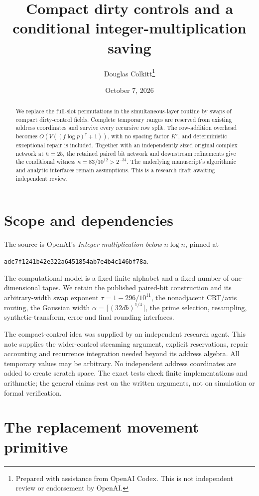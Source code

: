 \documentclass[11pt]{article}
\title{Compact dirty controls and a conditional integer-multiplication saving}
\author{Douglas Colkitt\thanks{Prepared with assistance from OpenAI Codex.
This is not independent review or endorsement by OpenAI.}}
\date{October 7, 2026}
\begin{document}
\maketitle
\begin{abstract}
We replace the full-slot permutations in the simultaneous-layer routine by
swaps of compact dirty-control fields. Complete temporary ranges are reserved
from existing address coordinates and survive every recursive row split.
The row-addition overhead becomes $O(V((f\log p)^\tau+1))$, with no spacing
factor $K^\tau$, and deterministic exceptional repair is included. Together
with an independently sized original complex network at $h=25$, the retained
paired bit network and downstream refinements give the conditional witness
$\kappa=83/10^{12}>2^{-34}$. The underlying manuscript's algorithmic and
analytic interfaces remain assumptions. This is a research draft awaiting
independent review.
\end{abstract}

\section{Scope and dependencies}
The source is OpenAI's \emph{Integer multiplication below $n\log n$}, pinned
at
\begin{center}\texttt{adc7f1241b42e322a6451854ab7e4b4c146bf78a}.\end{center}
The computational
model is a fixed finite alphabet and a fixed number of one-dimensional
tapes. We retain the published paired-bit construction and its arbitrary-width
swap exponent $\tau=1-296/10^{11}$, the nonadjacent CRT/axis routing, the
Gaussian width $\alpha=\lceil(32db)^{1/4}\rceil$, the prime selection,
resampling, synthetic-transform, error and final rounding interfaces.

The compact-control idea was supplied by an independent research agent.
This note supplies the wider-control streaming argument, explicit reservations,
repair accounting and recurrence integration needed beyond its address algebra.
All temporary values may be arbitrary. No independent address coordinates are
added to create scratch space. The exact tests check finite implementations and
arithmetic; the general claims rest on the written arguments, not on simulation
or formal verification.

\section{The replacement movement primitive}

\end{document}
